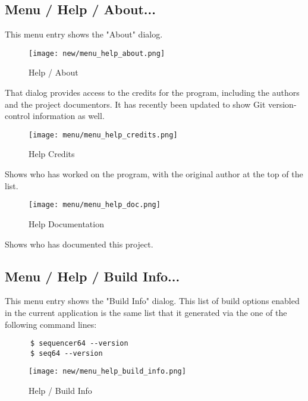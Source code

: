 \subsection{Menu / Help / About...}
\label{subsec:seq64_menu_about}

   This menu entry shows the "About" dialog.

\begin{figure}[H]
   \centering 
   \texttt{[image: new/menu\_help\_about.png]}
   \caption{Help / About}
   \label{fig:seq64_menu_help_about}
\end{figure}

   That dialog provides access to the credits for the program, including the
   authors and the project documentors.  It has recently been updated
   to show Git version-control information as well.

\begin{figure}[H]
   \centering 
   \texttt{[image: menu/menu\_help\_credits.png]}
   \caption{Help Credits}
   \label{fig:seq64_menu_help_credits}
\end{figure}

   Shows who has worked on the program, with the original author at the top
   of the list.

\begin{figure}[H]
   \centering 
   \texttt{[image: menu/menu\_help\_doc.png]}
   \caption{Help Documentation}
   \label{fig:seq64_menu_help_doc}
\end{figure}

   Shows who has documented this project.

\subsection{Menu / Help / Build Info...}
\label{subsec:seq64_menu_build_info}

   This menu entry shows the "Build Info" dialog.  This list of
   build options enabled in the current application is the same list
   that it generated via the one of the following command lines:

   \begin{verbatim}
      $ sequencer64 --version
      $ seq64 --version
   \end{verbatim}

\begin{figure}[H]
   \centering 
   \texttt{[image: new/menu\_help\_build\_info.png]}
   \caption{Help / Build Info}
   \label{fig:seq64_menu_help_build_info}
\end{figure}

